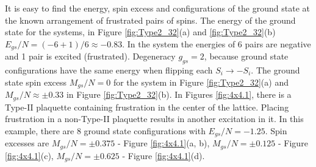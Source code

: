 \documentclass[preprint,12pt]{elsarticle}
\begin{document}
	
	It is easy to find the energy, spin excess and configurations of the ground state at the known arrangement of frustrated pairs of spins. The energy of the ground state for the systems, in Figure \ref{fig:Type2_32}(a) and \ref{fig:Type2_32}(b) $E_{gs}/N=(-6+1)/6\approx-0.83$. In the system the energies of 6 pairs are negative and 1 pair is excited (frustrated). Degeneracy $g_{gs}=2$, because ground state configurations have the same energy when flipping each $S_i \rightarrow -S_i$. The ground state spin excess $M_{gs}/N=0$ for the system in Figure \ref{fig:Type2_32}(a) and $M_{gs}/N\approx\pm 0.33$ in Figure \ref{fig:Type2_32}(b).
	In Figures \ref{fig:4x4.1}, there is a Type-II plaquette containing frustration in the center of the lattice. Placing frustration in a non-Type-II plaquette results in another excitation in it. In this example, there are 8 ground state configurations with $E_{gs}/N=-1.25$. Spin excesses are $M_{gs}/N=\pm 0.375$ - Figure \ref{fig:4x4.1}(a, b), $M_{gs}/N=\pm 0.125$ - Figure \ref{fig:4x4.1}(c), $M_{gs}/N=\pm 0.625$ - Figure \ref{fig:4x4.1}(d).
	
\end{document}
